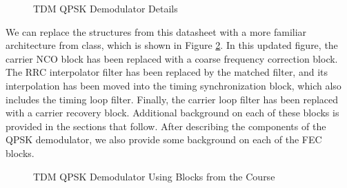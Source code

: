 \documentclass[conference,onecolumn]{IEEEtran}
\begin{document}
\begin{figure}[H]
	\centerline{}
	\caption{TDM QPSK Demodulator Details \cite{alldatasheetcom_2015_sta400a}}
	\label{fig::TDM_receiver_STA400}
\end{figure}

We can replace the structures from this datasheet with a more familiar architecture from class, which is shown in Figure \ref{fig::tdm_receiver_architecture}. In this updated figure, the carrier NCO block has been replaced with a coarse frequency correction block. The RRC interpolator filter has been replaced by the matched filter, and its interpolation has been moved into the timing synchronization block, which also includes the timing loop filter. Finally, the carrier loop filter has been replaced with a carrier recovery block. Additional background on each of these blocks is provided in the sections that follow. After describing the components of the QPSK demodulator, we also provide some background on each of the FEC blocks.


\begin{figure}[H]
	\centerline{}
	\caption{TDM QPSK Demodulator Using Blocks from the Course}
	\label{fig::tdm_receiver_architecture}
\end{figure}

\end{document}
